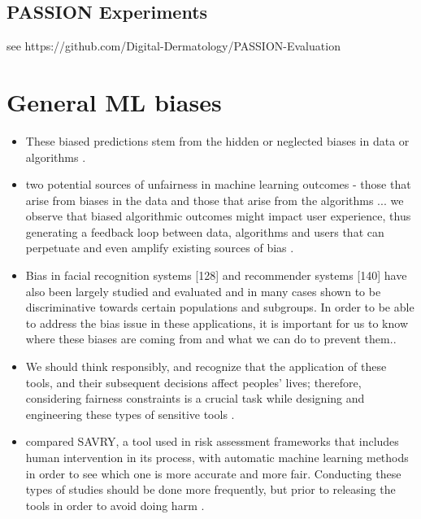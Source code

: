\documentclass[12pt, a4paper, oneside]{book}   	%
\begin{document}
			\subsection{PASSION Experiments}
				see https://github.com/Digital-Dermatology/PASSION-Evaluation
			
			
		\section{General ML biases}
			\begin{itemize}
				\item These biased predictions stem from the hidden or neglected biases in data or algorithms \autocite{Mehrabi_2021}.
				\item two potential sources of unfairness in machine learning outcomes - those that arise from biases in the data and those that arise from the algorithms ... we observe that biased algorithmic outcomes might impact user experience, thus generating a feedback loop between data, algorithms and users that can perpetuate and even amplify existing sources of bias \autocite{Mehrabi_2021}.
				\item Bias in facial recognition systems [128] and recommender systems [140] have also been largely studied and evaluated and in many cases shown to be discriminative towards certain populations and subgroups. In order to be able to address the bias issue in these applications, it is important for us to know where these biases are coming from and what we can do to prevent them.\autocite{Mehrabi_2021}.
				\item We should think responsibly, and recognize that the application of these tools, and their subsequent decisions affect peoples’ lives; therefore, considering fairness constraints is a crucial task while designing and engineering these types of sensitive tools \autocite{Mehrabi_2021}.
				\item compared SAVRY, a tool used in risk assessment frameworks that includes human intervention in its process, with automatic machine learning methods in order to see which one is more accurate and more fair. Conducting these types of studies should be done more frequently, but prior to releasing the tools in order to avoid doing harm \autocite{Mehrabi_2021}.

\end{itemize}
\end{document}
